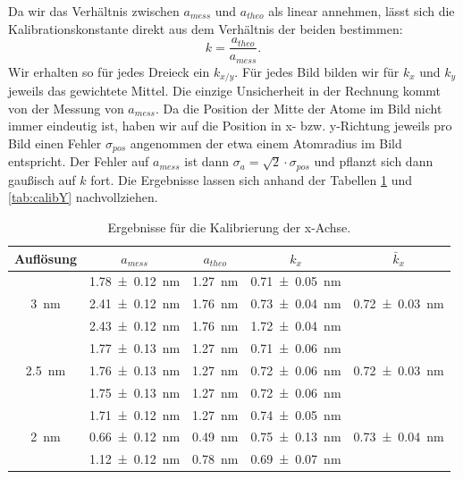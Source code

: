 Da wir das Verhältnis zwischen $a_{mess}$ und $a_{theo}$ als linear annehmen, lässt sich die Kalibrationskonstante direkt aus dem Verhältnis der beiden bestimmen:
\begin{equation}
k = \frac{a_{theo}}{a_{mess}}.
\end{equation}
Wir erhalten so für jedes Dreieck ein $k_{x/y}$. Für jedes Bild bilden wir für $k_x$ und $k_y$ jeweils das gewichtete Mittel. Die einzige Unsicherheit in der Rechnung kommt von der Messung von $a_{mess}$. Da die Position der Mitte der Atome im Bild nicht immer eindeutig ist, haben wir auf die Position in x- bzw. y-Richtung jeweils pro Bild einen Fehler $\sigma_{pos}$ angenommen der etwa einem Atomradius im Bild entspricht. Der Fehler auf $a_{mess}$ ist dann $\sigma_a = \sqrt{2} \cdot \sigma_{pos}$ und pflanzt sich dann gaußisch auf $k$ fort. Die Ergebnisse lassen sich anhand der Tabellen \ref{tab:calibX} und \ref{tab:calibY} nachvollziehen.

\begin{table}[H]
	\renewcommand{\arraystretch}{1.5}
	\centering
	\begin{tabular}{|c|c|c|c|c|}
		\hline
		Auflösung & $a_{mess}$ & $a_{theo}$ & $k_x$ & $\bar{k}_x$ \\
		\hline
		\multirow{3}{*}{\SI{3}{nm}} & \SI{1.78+-0.12}{nm} & \SI{1.27}{nm} & \SI{0.71+-0.05}{nm} & \multirow{3}{*}{\SI{0.72+-0.03}{nm}} \\
		 & \SI{2.41+-0.12}{nm} & \SI{1.76}{nm} & \SI{0.73+-0.04}{nm} & \\
		 & \SI{2.43+-0.12}{nm} & \SI{1.76}{nm} & \SI{1.72+-0.04}{nm} & \\
		\hline
		\multirow{3}{*}{\SI{2,5}{nm}} & \SI{1.77+-0.13}{nm} & \SI{1.27}{nm} & \SI{0.71+-0.06}{nm} & \multirow{3}{*}{\SI{0.72+-0.03}{nm}} \\
		 & \SI{1.76+-0.13}{nm} & \SI{1.27}{nm} & \SI{0.72+-0.06}{nm} & \\
		 & \SI{1.75+-0.13}{nm} & \SI{1.27}{nm} & \SI{0.72+-0.06}{nm} & \\
		\hline
		\multirow{3}{*}{\SI{2}{nm}} & \SI{1.71+-0.12}{nm} & \SI{1.27}{nm} & \SI{0.74+-0.05}{nm} & \multirow{3}{*}{\SI{0.73+-0.04}{nm}} \\
		 & \SI{0.66+-0.12}{nm} & \SI{0.49}{nm} & \SI{0.75+-0.13}{nm} & \\
		 & \SI{1.12+-0.12}{nm} & \SI{0.78}{nm} & \SI{0.69+-0.07}{nm} & \\
		\hline
	\end{tabular}
	\caption{Ergebnisse für die Kalibrierung der x-Achse.}
	\label{tab:calibX}
\end{table}

